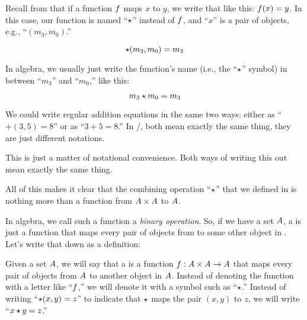 \documentclass[../../../main.tex]{subfiles}
\begin{document}
\begin{aside}
  \begin{notation}
    Recall from  that if a function $f$ maps $x$ to $y$, we write that like this: $f(x) = y$. In this case, our function is named ``$\opSymbol/$'' instead of $f$, and ``$x$'' is a pair of objects, e.g., ``$(m_{3}, m_{0})$.''
  \end{notation}
\end{aside}

\begin{equation*}
  \func{\opSymbol/}{(m_{3}, m_{0})} = m_{3}
\end{equation*}

In algebra, we usually just write the function's name (i.e., the ``$\opSymbol/$'' symbol) in between ``$m_{3}$'' and ``$m_{0}$,'' like this:

\begin{equation*}
  \op{m_{3}}{m_{0}} = m_{3}
\end{equation*}

\begin{aside}
  \begin{notation}
    We could write regular addition equations in the same two ways: either as ``$+(3, 5) = 8$'' or as ``$3 + 5 = 8$.'' In \math/, both mean exactly the same thing, they are just different notations.
  \end{notation}
\end{aside}

This is just a matter of notational convenience. Both ways of writing this out mean exactly the same thing.

All of this makes it clear that the combining operation ``$\opSymbol/$'' that we defined in  is nothing more than a function from $A \times A$ to $A$.

In algebra, we call such a function a \emph{binary operation}. So, if we have a set $A$, a  is just a function that maps every pair of objects from  to some other object in . Let's write that down as a definition:

\begin{fdefinition}
  \label{def:binary-operation}
  Given a set $A$, we will say that a  is a function $f: A \times A \rightarrow A$ that maps every pair of objects from $A$ to another object in $A$. Instead of denoting the function with a letter like ``$f$,'' we will denote it with a symbol such as ``$\opSymbol/$.'' Instead of writing ``$\opSymbol/(x, y) = z$'' to indicate that $\opSymbol/$ maps the pair $(x, y)$ to $z$, we will write ``$\op{x}{y} = z$.''
\end{fdefinition}
\end{document}

